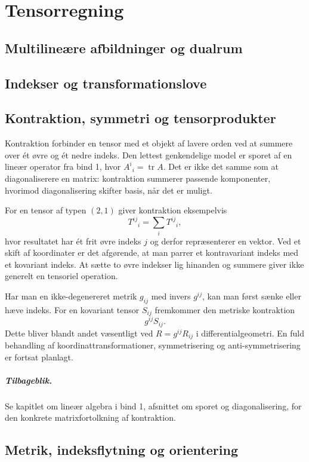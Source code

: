 \chapter{Tensorregning}
\section{Multilineære afbildninger og dualrum}
\leavevmode\par

\section{Indekser og transformationslove}
\leavevmode\par

\section{Kontraktion, symmetri og tensorprodukter}
\label{sec:tensor-kontraktion}
Kontraktion forbinder en tensor med et objekt af lavere orden ved at summere over ét øvre og ét nedre indeks. Den lettest genkendelige model er sporet af en lineær operator fra bind 1, hvor $A^i{}_i=\operatorname{tr}A$. Det er ikke det samme som at diagonaliserere en matrix: kontraktion summerer passende komponenter, hvorimod diagonalisering skifter basis, når det er muligt.

For en tensor af typen $(2,1)$ giver kontraktion eksempelvis
\[
T^{ij}{}_i=\sum_i T^{ij}{}_i,
\]
hvor resultatet har ét frit øvre indeks $j$ og derfor repræsenterer en vektor. Ved et skift af koordinater er det afgørende, at man parrer et kontravariant indeks med et kovariant indeks. At sætte to øvre indekser lig hinanden og summere giver ikke generelt en tensoriel operation.

Har man en ikke-degenereret metrik $g_{ij}$ med invers $g^{ij}$, kan man først sænke eller hæve indeks. For en kovariant tensor $S_{ij}$ fremkommer den metriske kontraktion
\[
g^{ij}S_{ij}.
\]
Dette bliver blandt andet væsentligt ved $R=g^{ij}R_{ij}$ i differentialgeometri. En fuld behandling af koordinattransformationer, symmetrisering og anti-symmetrisering er fortsat planlagt.

\paragraph{Tilbageblik.} Se kapitlet om lineær algebra i bind 1, afsnittet om sporet og diagonalisering, for den konkrete matrixfortolkning af kontraktion.

\section{Metrik, indeksflytning og orientering}
\leavevmode\par

